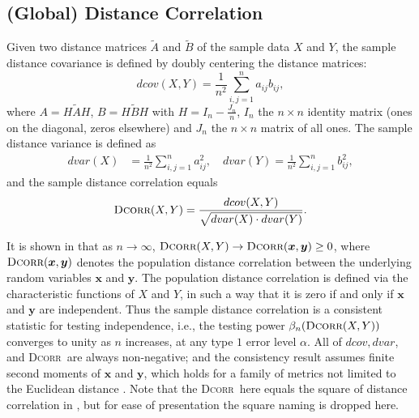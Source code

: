 \documentclass[11pt]{article}
\providecommand{\sct}[1]{{\normalfont\textsc{#1}}}
\providecommand{\mb}[1]{\boldsymbol{#1}}
\newcommand{\Dcorr}{\sct{Dcorr}}
\begin{document}
\subsection{(Global) Distance Correlation}
\label{appen:dcorr}
Given two distance matrices $\tilde{A}$ and $\tilde{B}$ of the sample data $X$ and $Y$, the sample distance covariance is defined by doubly centering the distance matrices:
\begin{equation*}
\label{dcovEqu}
dcov(X,Y)=\frac{1}{n^2}\sum_{i,j=1}^{n}a_{ij}b_{ij},
\end{equation*}
where $A=H\tilde{A}H$, $B=H\tilde{B}H$ with $H=I_{n}-\frac{J_{n}}{n}$, $I_n$ the $n \times n$ identity matrix (ones on the diagonal, zeros elsewhere)  and $J_n$ the $n \times n$ matrix of all ones. The sample distance variance is defined as
\begin{align*}
dvar(X) &=\frac{1}{n^2}\sum_{i,j=1}^{n}a_{ij}^{2},\quad dvar(Y) =\frac{1}{n^2}\sum_{i,j=1}^{n}b_{ij}^{2},
\end{align*}
and the sample distance correlation equals
\begin{equation*}
\Dcorr(X,Y)=\frac{dcov(X,Y)}{\sqrt{dvar(X) \cdot dvar(Y)}}.
\end{equation*}

It is shown in \cite{SzekelyRizzoBakirov2007} that as $n \rightarrow \infty$, $\Dcorr(X,Y) \rightarrow \Dcorr(\mb{x},\mb{y}) \geq 0$, where $\Dcorr(\mb{x},\mb{y})$ denotes the population distance correlation between the underlying random variables $\mb{x}$ and $\mb{y}$. The population distance correlation is defined via the characteristic functions of $X$ and $Y$, in such a way that it is zero if and only if $\mb{x}$ and $\mb{y}$ are independent. Thus the sample distance correlation is a consistent statistic for testing independence, i.e., the testing power $\beta_{n}(\Dcorr(X,Y))$
converges to unity as $n$ increases, at any type $1$ error level $\alpha$. All of $dcov, dvar$, and \Dcorr~are always non-negative; and the consistency result assumes finite second moments of $\mb{x}$ and $\mb{y}$, which holds for a family of metrics not limited to the Euclidean distance \cite{Lyons2013}. Note that the \Dcorr~here equals the square of distance correlation in \cite{SzekelyRizzoBakirov2007}, but for ease of presentation the square naming is dropped here.
\end{document}
